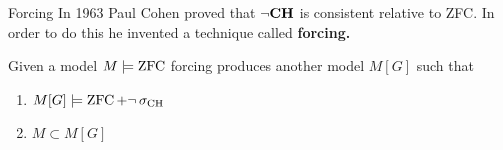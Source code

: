 \documentclass[pdf,final]{prosper}
\newcommand{\skipsmall}{\vspace{1em}}
\begin{document}
\begin{slide}{Forcing}
In 1963 Paul Cohen proved that $\neg\textbf{CH}$ is consistent relative to ZFC. In order
to do this he invented a technique called \textbf{forcing.}

\skipsmall

Given a model $M\models\operatorname{ZFC}$ forcing produces another model $M[G]$ such that
\begin{enumerate}
  \item $M[G]\models\operatorname{ZFC}+\neg\operatorname{\sigma_{\text{CH}}}$
  \item $M\subset M[G]$
\end{enumerate}

\end{slide}
\end{document}
